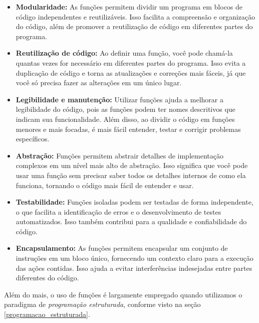 \documentclass[a4paper, 12pt, onecolumn,singlespacing]{article}
\begin{document}
	\begin{itemize}
		\item \textbf{Modularidade:} As funções permitem dividir um programa em blocos de código independentes e reutilizáveis. Isso facilita a compreensão e organização do código, além de promover a reutilização de código em diferentes partes do programa.
		
		\item \textbf{Reutilização de código:} Ao definir uma função, você pode chamá-la quantas vezes for necessário em diferentes partes do programa. Isso evita a duplicação de código e torna as atualizações e correções mais fáceis, já que você só precisa fazer as alterações em um único lugar.
		
		\item \textbf{Legibilidade e manutenção:} Utilizar funções ajuda a melhorar a legibilidade do código, pois as funções podem ter nomes descritivos que indicam sua funcionalidade. Além disso, ao dividir o código em funções menores e mais focadas, é mais fácil entender, testar e corrigir problemas específicos.
		
		\item \textbf{Abstração:} Funções permitem abstrair detalhes de implementação complexos em um nível mais alto de abstração. Isso significa que você pode usar uma função sem precisar saber todos os detalhes internos de como ela funciona, tornando o código mais fácil de entender e usar.
		
		\item \textbf{Testabilidade:} Funções isoladas podem ser testadas de forma independente, o que facilita a identificação de erros e o desenvolvimento de testes automatizados. Isso também contribui para a qualidade e confiabilidade do código.
		
		\item \textbf{Encapsulamento:} As funções permitem encapsular um conjunto de instruções em um bloco único, fornecendo um contexto claro para a execução das ações contidas. Isso ajuda a evitar interferências indesejadas entre partes diferentes do código.
		
	\end{itemize}

	Além do mais, o uso de funções é largamente empregado quando utilizamos o paradigma de \textit{programação estruturada}, conforme visto na seção \ref{programacao_estruturada}.
	
	
\end{document}
